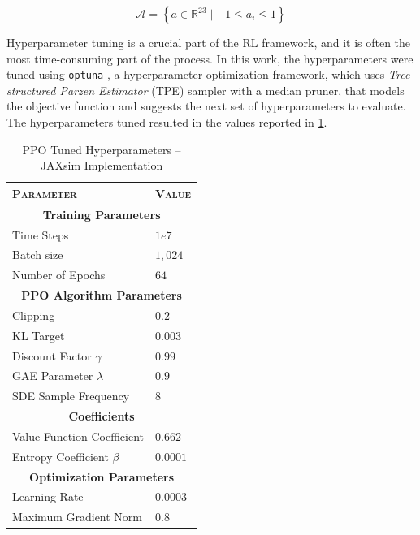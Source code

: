 \begin{equation}
    \label{eqn:ergocub_action_space}
    \mathcal{A} = \left\{ a \in \mathbb{R} ^{23} \mid -1 \leq a_i \leq 1 \right\}
\end{equation}

Hyperparameter tuning is a crucial part of the \ac{RL} framework, and it is often the most time-consuming part of the process. In this work, the hyperparameters were tuned using \texttt{optuna} \citep{akiba_optuna_2019}, a hyperparameter optimization framework, which uses \textit{Tree-structured Parzen Estimator} (\ac{TPE}) sampler with a median pruner, that models the objective function and suggests the next set of hyperparameters to evaluate. The hyperparameters tuned resulted in the values reported in \cref{tab:ppohyperparameters_jaxsim}.

\begin{table}[h]
    \centering
    \begin{tabular}{ll}
        \toprule
        \textsc{Parameter}          & \textsc{Value}          \\
        \midrule
        \multicolumn{2}{c}{\textbf{Training Parameters}}      \\
        Time Steps                  & $1e7$                   \\
        Batch size                  & $1,024$                 \\
        Number of Epochs            & $64$                    \\
        \midrule
        \multicolumn{2}{c}{\textbf{PPO Algorithm Parameters}} \\
        Clipping                    & $0.2$                   \\
        KL Target                   & $0.003$                 \\
        Discount Factor $\gamma$    & $0.99$                  \\
        GAE Parameter $\lambda$     & $0.9$                   \\
        SDE Sample Frequency        & $8$                     \\
        \midrule
        \multicolumn{2}{c}{\textbf{Coefficients}}             \\
        Value Function Coefficient  & $0.662$                 \\
        Entropy Coefficient $\beta$ & $0.0001$                \\
        \midrule
        \multicolumn{2}{c}{\textbf{Optimization Parameters}}  \\
        Learning Rate               & $0.0003$                \\
        Maximum Gradient Norm       & $0.8$                   \\
        \bottomrule
    \end{tabular}
    \caption{PPO Tuned Hyperparameters -- JAXsim Implementation}
    \label{tab:ppohyperparameters_jaxsim}
\end{table}

